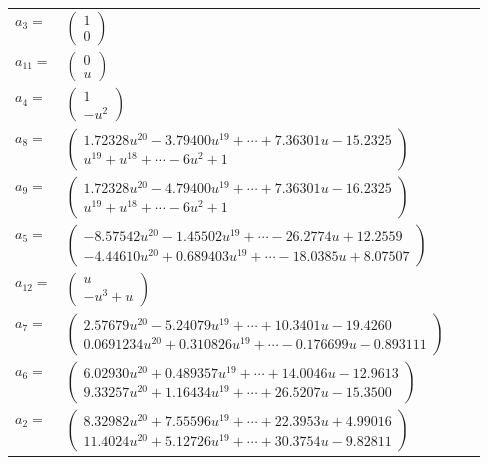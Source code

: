 \documentclass[1p]{elsarticle_modified}
\theoremstyle{definition}
\begin{document}
\begin{tabular}{m{7pt} m{180pt} m{7pt} m{180pt} }
\flushright $a_{3}=$&$\begin{pmatrix}1\\0\end{pmatrix}$ \\
\flushright $a_{11}=$&$\begin{pmatrix}0\\u\end{pmatrix}$ \\
\flushright $a_{4}=$&$\begin{pmatrix}1\\- u^2\end{pmatrix}$ \\
\flushright $a_{8}=$&$\begin{pmatrix}1.72328 u^{20}-3.79400 u^{19}+\cdots+7.36301 u-15.2325\\u^{19}+u^{18}+\cdots-6 u^2+1\end{pmatrix}$ \\
\flushright $a_{9}=$&$\begin{pmatrix}1.72328 u^{20}-4.79400 u^{19}+\cdots+7.36301 u-16.2325\\u^{19}+u^{18}+\cdots-6 u^2+1\end{pmatrix}$ \\
\flushright $a_{5}=$&$\begin{pmatrix}-8.57542 u^{20}-1.45502 u^{19}+\cdots-26.2774 u+12.2559\\-4.44610 u^{20}+0.689403 u^{19}+\cdots-18.0385 u+8.07507\end{pmatrix}$ \\
\flushright $a_{12}=$&$\begin{pmatrix}u\\- u^3+u\end{pmatrix}$ \\
\flushright $a_{7}=$&$\begin{pmatrix}2.57679 u^{20}-5.24079 u^{19}+\cdots+10.3401 u-19.4260\\0.0691234 u^{20}+0.310826 u^{19}+\cdots-0.176699 u-0.893111\end{pmatrix}$ \\
\flushright $a_{6}=$&$\begin{pmatrix}6.02930 u^{20}+0.489357 u^{19}+\cdots+14.0046 u-12.9613\\9.33257 u^{20}+1.16434 u^{19}+\cdots+26.5207 u-15.3500\end{pmatrix}$ \\
\flushright $a_{2}=$&$\begin{pmatrix}8.32982 u^{20}+7.55596 u^{19}+\cdots+22.3953 u+4.99016\\11.4024 u^{20}+5.12726 u^{19}+\cdots+30.3754 u-9.82811\end{pmatrix}$ \\

\end{tabular}
\end{document}
